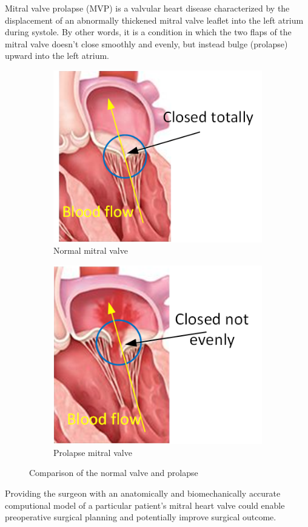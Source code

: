 Mitral valve prolapse (MVP) is a valvular heart disease characterized by the
displacement of an abnormally thickened mitral valve leaflet into the left
atrium during systole. By other words, it is a condition in which the two flaps
of the mitral valve doesn't close smoothly and evenly, but instead bulge
(prolapse) upward into the left atrium.\cite{Hayek2005a}
\begin{figure}[H]\label{fig:compareMT}
  \centering
  \begin{subfigure}[b]{0.3\textwidth}\label{fig:normalMT}
    \includegraphics[width=\textwidth]{./fig/normalMT.png}
      \caption{Normal mitral valve}      
  \end{subfigure}
  \begin{subfigure}[b]{0.3\textwidth}\label{fig:prolapseMT}
    \includegraphics[width=\textwidth]{./fig/prolapseMT.png}
      \caption{Prolapse mitral valve}      
  \end{subfigure}
  \caption{Comparison of the normal valve and prolapse}      
\end{figure}

Providing the surgeon with an anatomically and biomechanically accurate
computional model of a particular patient's mitral heart valve could enable
preoperative surgical planning and potentially improve surgical outcome.\par
